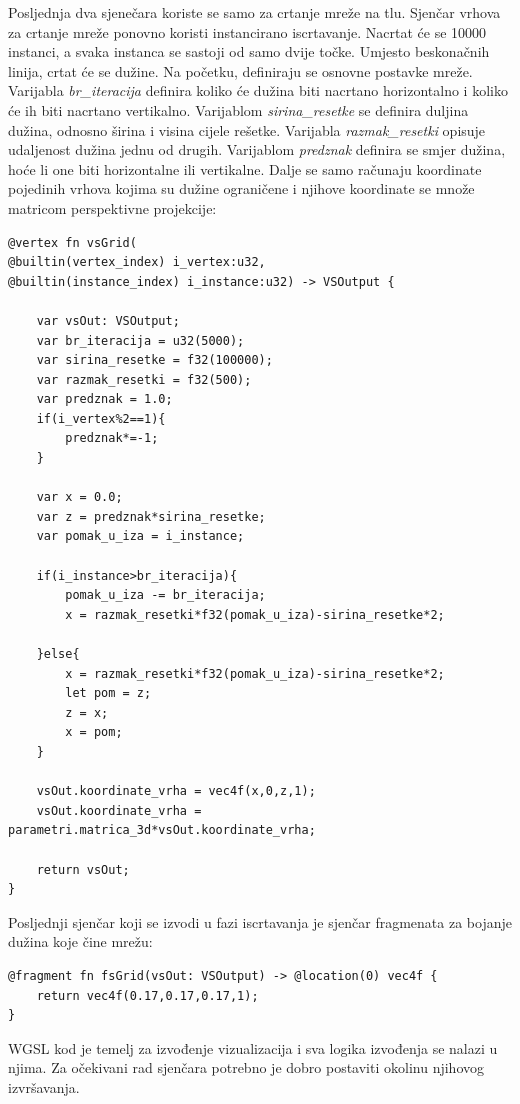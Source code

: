 \documentclass{foi}
\begin{document}
Posljednja dva sjenečara koriste se samo za crtanje mreže na tlu. Sjenčar vrhova za crtanje mreže ponovno koristi instancirano iscrtavanje. Nacrtat će se 10000 instanci, a svaka instanca se sastoji od samo dvije točke. Umjesto beskonačnih linija, crtat će se dužine. Na početku, definiraju se osnovne postavke mreže. Varijabla \textit{br\_iteracija} definira koliko će dužina biti nacrtano horizontalno i koliko će ih biti nacrtano vertikalno. Varijablom \textit{sirina\_resetke} se definira duljina dužina, odnosno širina i visina cijele rešetke. Varijabla \textit{razmak\_resetki} opisuje udaljenost dužina jednu od drugih. Varijablom \textit{predznak} definira se smjer dužina, hoće li one biti horizontalne ili vertikalne. Dalje se samo računaju koordinate pojedinih vrhova kojima su dužine ograničene i njihove koordinate se množe matricom perspektivne projekcije:
\begin{verbatim}
@vertex fn vsGrid(
@builtin(vertex_index) i_vertex:u32,
@builtin(instance_index) i_instance:u32) -> VSOutput {
	
	var vsOut: VSOutput;
	var br_iteracija = u32(5000);
	var sirina_resetke = f32(100000);
	var razmak_resetki = f32(500);
	var predznak = 1.0;
	if(i_vertex%2==1){
		predznak*=-1;
	}
	
	var x = 0.0;
	var z = predznak*sirina_resetke;
	var pomak_u_iza = i_instance;
	
	if(i_instance>br_iteracija){
		pomak_u_iza -= br_iteracija;
		x = razmak_resetki*f32(pomak_u_iza)-sirina_resetke*2;
		
	}else{
		x = razmak_resetki*f32(pomak_u_iza)-sirina_resetke*2;
		let pom = z;
		z = x;
		x = pom;
	}
	
	vsOut.koordinate_vrha = vec4f(x,0,z,1);
	vsOut.koordinate_vrha = parametri.matrica_3d*vsOut.koordinate_vrha;
	
	return vsOut;
}

\end{verbatim}

Posljednji sjenčar koji se izvodi u fazi iscrtavanja je sjenčar fragmenata za bojanje dužina koje čine mrežu:

\begin{verbatim}
@fragment fn fsGrid(vsOut: VSOutput) -> @location(0) vec4f {
	return vec4f(0.17,0.17,0.17,1);
}
\end{verbatim}

WGSL kod je temelj za izvođenje vizualizacija i sva logika izvođenja se nalazi u njima. Za očekivani rad sjenčara potrebno je dobro postaviti okolinu njihovog izvršavanja.
\end{document}

